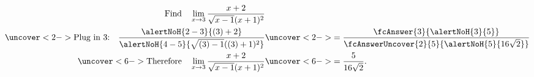\begin{frame}
\begin{example}%
\abovedisplayskip=0pt
\belowdisplayskip=-15pt
\abovedisplayshortskip=0pt
\belowdisplayshortskip=0pt
\begin{align*}
\text{Find}\quad \lim_{x\to 3}
\frac%
{x+2}%
{\sqrt{x-1}(x+1)^2}%
& \\%
\uncover<2->{%
\text{Plug in 3:}\quad%
\frac%
{\alertNoH{ 2-3}{(3)+2}}%
{\alertNoH{ 4-5}{\sqrt{(3)-1}((3)+1)^2}}%
}%
& \uncover<2->{%
= \frac%
{\fcAnswer{3}{\alertNoH{ 3}{5}}}%
{\fcAnswerUncover{2}{5}{\alertNoH{ 5}{16\sqrt{2}}}}%
}\\%
\uncover<6->{%
\text{Therefore}\quad \lim_{x\to 3}\frac{x+2}{\sqrt{x-1}(x+1)^2}%
}%
& \uncover<6->{%
= \frac{5}{16\sqrt{2}}.}%
\end{align*}
\end{example}
\end{frame}
